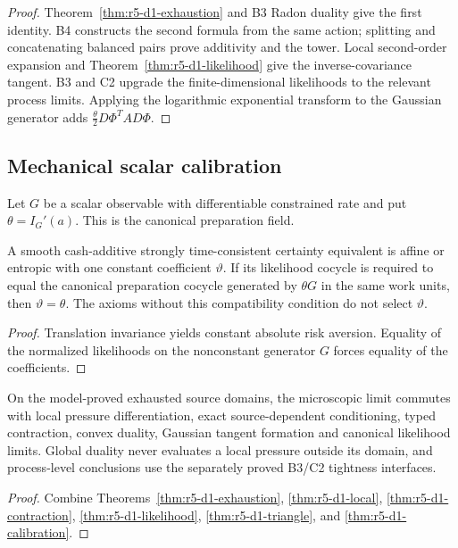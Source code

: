 \begin{proof}
Theorem~\ref{thm:r5-d1-exhaustion} and B3 Radon duality give the first
identity.  B4 constructs the second formula from the same action; splitting
and concatenating balanced pairs prove additivity and the tower.  Local
second-order expansion and
Theorem~\ref{thm:r5-d1-likelihood} give the inverse-covariance tangent.
B3 and C2 upgrade the finite-dimensional likelihoods to the relevant process
limits.  Applying the logarithmic exponential transform to the Gaussian
generator adds \(\frac\theta2D\Phi^TAD\Phi\).
\end{proof}

\subsection{Mechanical scalar calibration}

Let \(G\) be a scalar observable with differentiable constrained rate and put
\(\theta=I_G'(a)\).  This is the canonical preparation field.

\begin{theorem}
\label{thm:r5-d1-calibration}
A smooth cash-additive strongly time-consistent certainty equivalent is affine
or entropic with one constant coefficient \(\vartheta\).  If its likelihood
cocycle is required to equal the canonical preparation cocycle generated by
\(\theta G\) in the same work units, then \(\vartheta=\theta\).  The axioms
without this compatibility condition do not select \(\vartheta\).
\end{theorem}

\begin{proof}
Translation invariance yields constant absolute risk aversion.  Equality of
the normalized likelihoods on the nonconstant generator \(G\) forces equality
of the coefficients.
\end{proof}

\begin{theorem}
\label{thm:r5-d1-main}
On the model-proved exhausted source domains, the microscopic limit commutes
with local pressure differentiation, exact source-dependent conditioning,
typed contraction, convex duality, Gaussian tangent formation and canonical
likelihood limits.  Global duality never evaluates a local pressure outside
its domain, and process-level conclusions use the separately proved B3/C2
tightness interfaces.
\end{theorem}

\begin{proof}
Combine Theorems~\ref{thm:r5-d1-exhaustion},
\ref{thm:r5-d1-local}, \ref{thm:r5-d1-contraction},
\ref{thm:r5-d1-likelihood}, \ref{thm:r5-d1-triangle}, and
\ref{thm:r5-d1-calibration}.
\end{proof}
